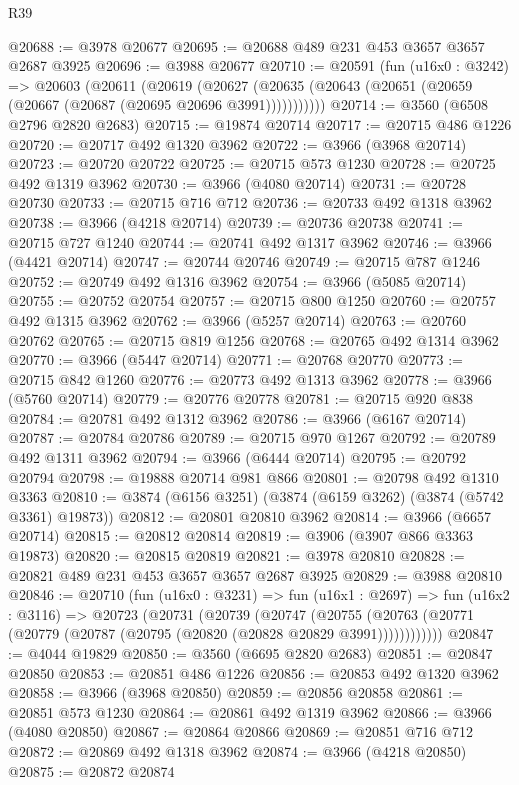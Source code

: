 \begin{lexlean}{R39}
\begin{coremodule}
@20688 := @3978 @20677
@20695 := @20688 @489 @231 @453 @3657 @3657 @2687 @3925
@20696 := @3988 @20677
@20710 := @20591
    (fun (u16x0 : @3242) =>
    @20603
      (@20611
        (@20619
          (@20627 (@20635 (@20643 (@20651 (@20659 (@20667 (@20687 (@20695 @20696 @3991)))))))))))
@20714 := @3560 (@6508 @2796 @2820 @2683)
@20715 := @19874 @20714
@20717 := @20715 @486 @1226
@20720 := @20717 @492 @1320 @3962
@20722 := @3966 (@3968 @20714)
@20723 := @20720 @20722
@20725 := @20715 @573 @1230
@20728 := @20725 @492 @1319 @3962
@20730 := @3966 (@4080 @20714)
@20731 := @20728 @20730
@20733 := @20715 @716 @712
@20736 := @20733 @492 @1318 @3962
@20738 := @3966 (@4218 @20714)
@20739 := @20736 @20738
@20741 := @20715 @727 @1240
@20744 := @20741 @492 @1317 @3962
@20746 := @3966 (@4421 @20714)
@20747 := @20744 @20746
@20749 := @20715 @787 @1246
@20752 := @20749 @492 @1316 @3962
@20754 := @3966 (@5085 @20714)
@20755 := @20752 @20754
@20757 := @20715 @800 @1250
@20760 := @20757 @492 @1315 @3962
@20762 := @3966 (@5257 @20714)
@20763 := @20760 @20762
@20765 := @20715 @819 @1256
@20768 := @20765 @492 @1314 @3962
@20770 := @3966 (@5447 @20714)
@20771 := @20768 @20770
@20773 := @20715 @842 @1260
@20776 := @20773 @492 @1313 @3962
@20778 := @3966 (@5760 @20714)
@20779 := @20776 @20778
@20781 := @20715 @920 @838
@20784 := @20781 @492 @1312 @3962
@20786 := @3966 (@6167 @20714)
@20787 := @20784 @20786
@20789 := @20715 @970 @1267
@20792 := @20789 @492 @1311 @3962
@20794 := @3966 (@6444 @20714)
@20795 := @20792 @20794
@20798 := @19888 @20714 @981 @866
@20801 := @20798 @492 @1310 @3363
@20810 := @3874 (@6156 @3251) (@3874 (@6159 @3262) (@3874 (@5742 @3361) @19873))
@20812 := @20801 @20810 @3962
@20814 := @3966 (@6657 @20714)
@20815 := @20812 @20814
@20819 := @3906 (@3907 @866 @3363 @19873)
@20820 := @20815 @20819
@20821 := @3978 @20810
@20828 := @20821 @489 @231 @453 @3657 @3657 @2687 @3925
@20829 := @3988 @20810
@20846 := @20710
    (fun (u16x0 : @3231) =>
    fun (u16x1 : @2697) =>
    fun (u16x2 : @3116) =>
    @20723
      (@20731
        (@20739
          (@20747
            (@20755 (@20763 (@20771 (@20779 (@20787 (@20795 (@20820 (@20828 @20829 @3991))))))))))))
@20847 := @4044 @19829
@20850 := @3560 (@6695 @2820 @2683)
@20851 := @20847 @20850
@20853 := @20851 @486 @1226
@20856 := @20853 @492 @1320 @3962
@20858 := @3966 (@3968 @20850)
@20859 := @20856 @20858
@20861 := @20851 @573 @1230
@20864 := @20861 @492 @1319 @3962
@20866 := @3966 (@4080 @20850)
@20867 := @20864 @20866
@20869 := @20851 @716 @712
@20872 := @20869 @492 @1318 @3962
@20874 := @3966 (@4218 @20850)
@20875 := @20872 @20874

\end{coremodule}
\end{lexlean}
